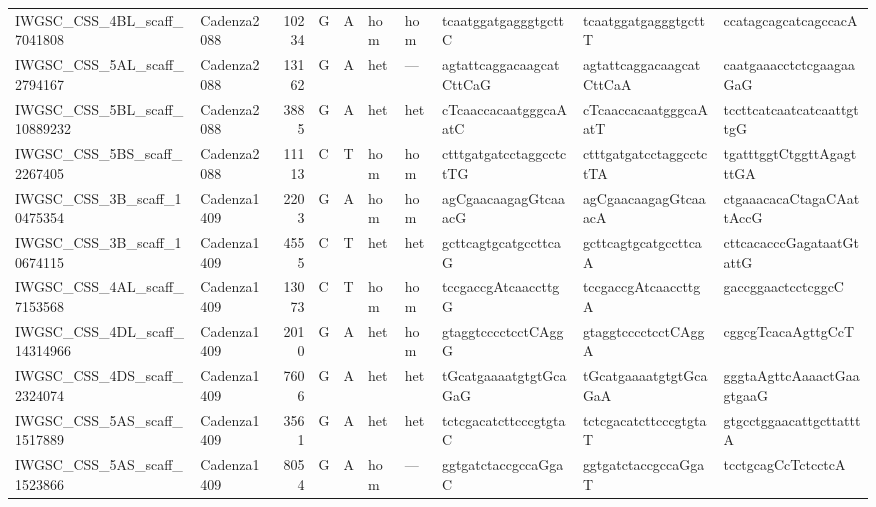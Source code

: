 \begin{longtable}{llrlllllll}
 IWGSC\_CSS\_4BL\_scaff\_7041808  & Cadenza2088 &      10234 & G         & A        & hom            & hom         & tcaatggatgagggtgcttC      & tcaatggatgagggtgcttT      & ccatagcagcatcagccacA      \\
 IWGSC\_CSS\_5AL\_scaff\_2794167  & Cadenza2088 &      13162 & G         & A        & het            & ---         & agtattcaggacaagcatCttCaG  & agtattcaggacaagcatCttCaA  & caatgaaacctctcgaagaaGaG   \\
 IWGSC\_CSS\_5BL\_scaff\_10889232 & Cadenza2088 &       3885 & G         & A        & het            & het         & cTcaaccacaatgggcaAatC     & cTcaaccacaatgggcaAatT     & tccttcatcaatcatcaattgttgG \\
 IWGSC\_CSS\_5BS\_scaff\_2267405  & Cadenza2088 &      11113 & C         & T        & hom            & hom         & ctttgatgatcctaggcctctTG   & ctttgatgatcctaggcctctTA   & tgatttggtCtggttAgagtttGA  \\
 IWGSC\_CSS\_3B\_scaff\_10475354  & Cadenza1409 &       2203 & G         & A        & hom            & hom         & agCgaacaagagGtcaaacG      & agCgaacaagagGtcaaacA      & ctgaaacacaCtagaCAattAccG  \\
 IWGSC\_CSS\_3B\_scaff\_10674115  & Cadenza1409 &       4555 & C         & T        & het            & het         & gcttcagtgcatgccttcaG      & gcttcagtgcatgccttcaA      & cttcacacccGagataatGtattG  \\
 IWGSC\_CSS\_4AL\_scaff\_7153568  & Cadenza1409 &      13073 & C         & T        & hom            & hom         & tccgaccgAtcaaccttgG       & tccgaccgAtcaaccttgA       & gaccggaactcctcggcC        \\
 IWGSC\_CSS\_4DL\_scaff\_14314966 & Cadenza1409 &       2010 & G         & A        & het            & hom         & gtaggtcccctcctCAggG       & gtaggtcccctcctCAggA       & cggcgTcacaAgttgCcT        \\
 IWGSC\_CSS\_4DS\_scaff\_2324074  & Cadenza1409 &       7606 & G         & A        & het            & het         & tGcatgaaaatgtgtGcaGaG     & tGcatgaaaatgtgtGcaGaA     & gggtaAgttcAaaactGaagtgaaG \\
 IWGSC\_CSS\_5AS\_scaff\_1517889  & Cadenza1409 &       3561 & G         & A        & het            & het         & tctcgacatcttcccgtgtaC     & tctcgacatcttcccgtgtaT     & gtgcctggaacattgcttatttA   \\
 IWGSC\_CSS\_5AS\_scaff\_1523866  & Cadenza1409 &       8054 & G         & A        & hom            & ---         & ggtgatctaccgccaGgaC       & ggtgatctaccgccaGgaT       & tcctgcagCcTctcctcA        \\

\end{longtable}

